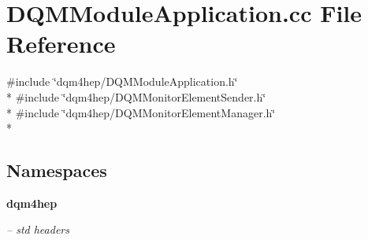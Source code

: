 \section{D\+Q\+M\+Module\+Application.\+cc File Reference}
\label{DQMModuleApplication_8cc}
{\ttfamily \#include \char`\"{}dqm4hep/\+D\+Q\+M\+Module\+Application.\+h\char`\"{}}\\*
{\ttfamily \#include \char`\"{}dqm4hep/\+D\+Q\+M\+Monitor\+Element\+Sender.\+h\char`\"{}}\\*
{\ttfamily \#include \char`\"{}dqm4hep/\+D\+Q\+M\+Monitor\+Element\+Manager.\+h\char`\"{}}\\*
\subsection*{Namespaces}
\begin{DoxyCompactItemize}
\item 
 {\bf dqm4hep}
\begin{DoxyCompactList}\small\item\em -- std headers \end{DoxyCompactList}\end{DoxyCompactItemize}
